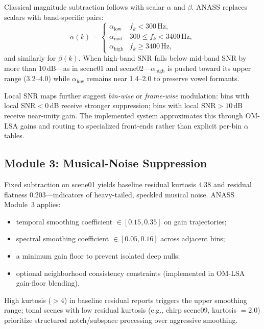 Classical magnitude subtraction follows  with scalar $\alpha$ and $\beta$. ANASS replaces scalars with band-specific pairs:
\begin{equation}
  \alpha(k) =
  \begin{cases}
    \alpha_{\mathrm{low}}  & f_k < 300\,\mathrm{Hz}, \\
    \alpha_{\mathrm{mid}}  & 300 \le f_k < 3400\,\mathrm{Hz}, \\
    \alpha_{\mathrm{high}} & f_k \ge 3400\,\mathrm{Hz},
  \end{cases}
\end{equation}
and similarly for $\beta(k)$. When high-band SNR falls below mid-band SNR by more than 10\,dB---as in scene01 and scene02---$\alpha_{\mathrm{high}}$ is pushed toward its upper range (3.2--4.0) while $\alpha_{\mathrm{low}}$ remains near 1.4--2.0 to preserve vowel formants.

Local SNR maps further suggest \emph{bin-wise} or \emph{frame-wise} modulation: bins with local SNR${}<0$\,dB receive stronger suppression; bins with local SNR${}>10$\,dB receive near-unity gain. The implemented system approximates this through OM-LSA gains and routing to specialized front-ends rather than explicit per-bin $\alpha$ tables.

\subsection{Module 3: Musical-Noise Suppression}

Fixed subtraction on scene01 yields baseline residual kurtosis $4.38$ and residual flatness 0.203---indicators of heavy-tailed, speckled musical noise. ANASS Module~3 applies:
\begin{itemize}
  \item temporal smoothing coefficient $\in [0.15, 0.35]$ on gain trajectories;
  \item spectral smoothing coefficient $\in [0.05, 0.16]$ across adjacent bins;
  \item a minimum gain floor to prevent isolated deep nulls;
  \item optional neighborhood consistency constraints (implemented in OM-LSA gain-floor blending).
\end{itemize}

High kurtosis ($>4$) in baseline residual reports triggers the upper smoothing range; tonal scenes with low residual kurtosis (e.g., chirp scene09, kurtosis $=2.0$) prioritize structured notch/subspace processing over aggressive smoothing.

